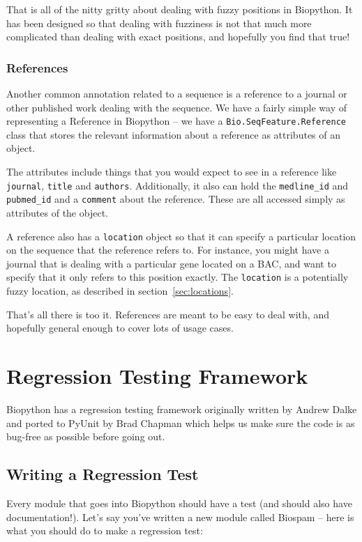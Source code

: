 \documentclass{report}
\begin{document}
That is all of the nitty gritty about dealing with fuzzy positions in Biopython. It has been designed so that dealing with fuzziness is not that much more complicated than dealing with exact positions, and hopefully you find that true!

\subsubsection{References}

Another common annotation related to a sequence is a reference to a journal or other published work dealing with the sequence. We have a fairly simple way of representing a Reference in Biopython -- we have a \verb|Bio.SeqFeature.Reference| class that stores the relevant information about a reference as attributes of an object.

The attributes include things that you would expect to see in a reference like \verb|journal|, \verb|title| and \verb|authors|. Additionally, it also can hold the \verb|medline_id| and \verb|pubmed_id| and a \verb|comment| about the reference. These are all accessed simply as attributes of the object.

A reference also has a \verb|location| object so that it can specify a particular location on the sequence that the reference refers to. For instance, you might have a journal that is dealing with a particular gene located on a BAC, and want to specify that it only refers to this position exactly. The \verb|location| is a potentially fuzzy location, as described in section~\ref{sec:locations}.

That's all there is too it. References are meant to be easy to deal with, and hopefully general enough to cover lots of usage cases.

\section{Regression Testing Framework}
\label{sec:regr_test}

Biopython has a regression testing framework originally written by Andrew Dalke and ported to PyUnit by Brad Chapman which helps us make sure the code is as bug-free as possible before going out.

\subsection{Writing a Regression Test}

Every module that goes into Biopython should have a test (and should also have documentation!). Let's say you've written a new module called Biospam -- here is what you should do to make a regression test:
\end{document}
